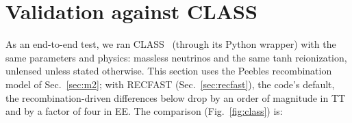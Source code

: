 \section{Validation against CLASS}\label{sec:validation}

As an end-to-end test, we ran CLASS~\cite{Lesgourgues2011,Blas2011} (through its Python wrapper) with the same
parameters and physics: massless neutrinos and the same tanh reionization, unlensed unless stated otherwise. This
section uses the Peebles recombination model of Sec.~\ref{sec:m2}; with RECFAST (Sec.~\ref{sec:recfast}), the
code's default, the recombination-driven differences below drop by an order of magnitude in TT and by a factor of four in EE. The comparison
(Fig.~\ref{fig:class}) is:
